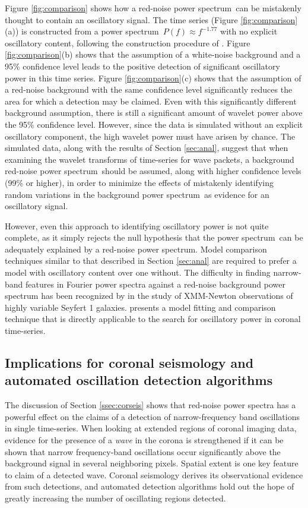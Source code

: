 \documentclass{aastex}
\newcommand{\PS}{power spectrum}
\begin{document}
{Figure \ref{fig:comparison} shows how a red-noise \PS\ can be
mistakenly thought to contain an oscillatory signal.  The time series
(Figure \ref{fig:comparison}(a)) is constructed from a \PS\
$P(f)\approx f^{-1.77}$ with no explicit oscillatory content,
following the construction procedure of \cite{2010MNRAS.402..307V}.
Figure \ref{fig:comparison}(b) shows that the assumption of a
white-noise background and a 95\% confidence level leads to the
positive detection of significant oscillatory power in this time
series. Figure \ref{fig:comparison}(c) shows that the assumption of a
red-noise background with the same confidence level significantly
reduces the area for which a detection may be claimed.  Even with this
significantly different background assumption, there is still a
significant amount of wavelet power above the 95\% confidence level.
However, since the data is simulated without an explicit oscillatory
component, the high wavelet power must have arisen by chance.  The
simulated data, along with the results of Section \ref{sec:anal},
suggest that when examining the wavelet transforms of time-series for
wave packets, a background red-noise \PS\ should be assumed, along
with higher confidence levels (99\% or higher), in order to minimize
the effects of mistakenly identifying random variations in the
background \PS\ as evidence for an oscillatory signal.

However, even this approach to identifying oscillatory power is not
quite complete, as it simply rejects the null hypothesis that the
\PS\ can be adequately explained by a red-noise power
spectrum.  Model comparison techniques similar to that described in
Section \ref{sec:anal} are required to prefer a model with oscillatory
content over one without. The difficulty in finding narrow-band
features in Fourier power spectra against a red-noise background power
spectrum has been recognized by \cite{2010MNRAS.402..307V} in the
study of XMM-Newton observations of highly variable Seyfert 1
galaxies.  \cite{2010MNRAS.402..307V} presents a model fitting and
comparison technique that is directly applicable to the search for
oscillatory power in coronal time-series.

\subsection{Implications for coronal seismology and automated
  oscillation detection algorithms}\label{sec:oscdetect}

The discussion of Section \ref{ssec:corseis} shows that red-noise
power spectra has a powerful effect on the claims of a detection of
narrow-frequency band oscillations in single time-series.  When
looking at extended regions of coronal imaging data, evidence for the
presence of a {\it wave} in the corona is strengthened if it can be
shown that narrow frequency-band oscillations occur significantly
above the background signal in several neighboring pixels.  Spatial
extent is one key feature to claim of a detected wave.  Coronal
seismology derives its observational evidence from such detections,
and automated detection algorithms hold out the hope of greatly
increasing the number of oscillating regions detected.

}
\end{document}
